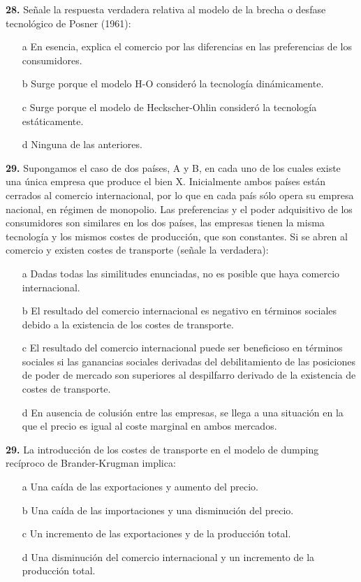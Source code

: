 \documentclass{nuevotema}
\begin{document}
\textbf{28.} Señale la respuesta verdadera relativa al modelo de la brecha o desfase tecnológico de Posner (1961):

\begin{enumerate}
	\item[a] En esencia, explica el comercio por las diferencias en las preferencias de los consumidores.
	\item[b] Surge porque el modelo H-O consideró la tecnología dinámicamente.
	\item[c] Surge porque el modelo de Heckscher-Ohlin consideró la tecnología estáticamente.
	\item[d] Ninguna de las anteriores.
\end{enumerate}

\textbf{29.} Supongamos el caso de dos países, A y B, en cada uno de los cuales existe una única empresa que produce el bien X. Inicialmente ambos países están cerrados al comercio internacional, por lo que en cada país sólo opera su empresa nacional, en régimen de monopolio. Las preferencias y el poder adquisitivo de los consumidores son similares en los dos países, las empresas tienen la misma tecnología y los mismos costes de producción, que son constantes. Si se abren al comercio y existen costes de transporte (señale la verdadera):
\begin{itemize}
	\item[a] Dadas todas las similitudes enunciadas, no es posible que haya comercio internacional.
	\item[b] El resultado del comercio internacional es negativo en términos sociales debido a la existencia de los costes de transporte.
	\item[c] El resultado del comercio internacional puede ser beneficioso en términos sociales si las ganancias sociales derivadas del debilitamiento de las posiciones de poder de mercado son superiores al despilfarro derivado de la existencia de costes de transporte.
	\item[d] En ausencia de colusión entre las empresas, se llega a una situación en la que el precio es igual al coste marginal en ambos mercados.
\end{itemize}

\textbf{29.} La introducción de los costes de transporte en el modelo de dumping recíproco de Brander-Krugman implica:
\begin{itemize}
	\item[a] Una caída de las exportaciones y aumento del precio.
	\item[b] Una caída de las importaciones y una disminución del precio.
	\item[c] Un incremento de las exportaciones y de la producción total.
	\item[d] Una disminución del comercio internacional y un incremento de la producción total.
\end{itemize}
\end{document}
